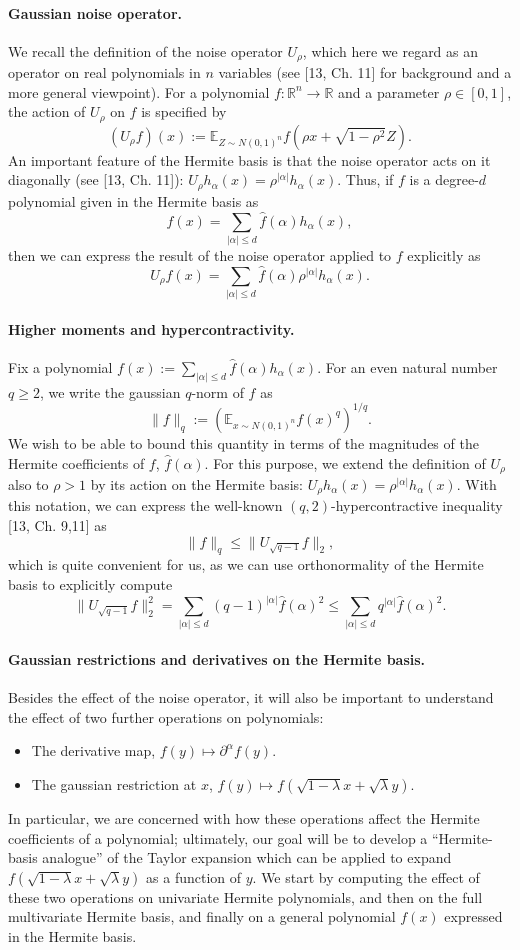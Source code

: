 \paragraph{Gaussian noise operator.} We recall the definition of the noise operator $U_\rho$, which here we regard as an operator on real polynomials in $n$ variables (see [13, Ch. 11] for background and a more general viewpoint). For a polynomial $f:\mathbb R^n\to\mathbb R$ and a parameter $\rho\in[0,1]$, the action of $U_\rho$ on $f$ is specified by
\[(U_\rho f)(x):=\mathbb E_{Z\sim N(0,1)^n}f(\rho x+\sqrt{1-\rho^2}Z).\]
An important feature of the Hermite basis is that the noise operator acts on it diagonally (see [13, Ch. 11]): $U_\rho h_\alpha(x)=\rho^{|\alpha|}h_\alpha(x)$. Thus, if $f$ is a degree-$d$ polynomial given in the Hermite basis as
\[f(x)=\sum_{|\alpha|\leq d}\widehat f(\alpha)h_\alpha(x),\]
then we can express the result of the noise operator applied to $f$ explicitly as
\[U_\rho f(x)=\sum_{|\alpha|\leq d}\widehat f(\alpha)\rho^{|\alpha|}h_\alpha(x).\]
\paragraph{Higher moments and hypercontractivity.} Fix a polynomial $f(x):=\sum_{|\alpha|\leq d}\widehat f(\alpha)h_\alpha(x)$. For an even natural number $q\geq2$, we write the gaussian $q$-norm of $f$ as
\[\|f\|_q:=\left(\mathbb E_{x\sim N(0,1)^n}f(x)^q\right)^{1/q}.\]
We wish to be able to bound this quantity in terms of the magnitudes of the Hermite coefficients of $f$, $\widehat f(\alpha)$. For this purpose, we extend the definition of $U_\rho$ also to $\rho>1$ by its action on the Hermite basis: $U_\rho h_\alpha(x)=\rho^{|\alpha|}h_\alpha(x)$. With this notation, we can express the well-known $(q,2)$-hypercontractive inequality [13, Ch. 9,11] as
\[\|f\|_q\leq\|U_{\sqrt{q-1}}f\|_2,\]
which is quite convenient for us, as we can use orthonormality of the Hermite basis to explicitly compute
\[\|U_{\sqrt{q-1}}f\|_2^2=\sum_{|\alpha|\leq d}(q-1)^{|\alpha|}\widehat f(\alpha)^2\leq\sum_{|\alpha|\leq d}q^{|\alpha|}\widehat f(\alpha)^2.\]
\paragraph{Gaussian restrictions and derivatives on the Hermite basis.} Besides the effect of the noise operator, it will also be important to understand the effect of two further operations on polynomials:
\begin{itemize}
\item The derivative map, $f(y)\mapsto\partial^\alpha f(y)$.
\item The gaussian restriction at $x$, $f(y)\mapsto f(\sqrt{1-\lambda}x+\sqrt\lambda y)$.
\end{itemize}
In particular, we are concerned with how these operations affect the Hermite coefficients of a polynomial; ultimately, our goal will be to develop a ``Hermite-basis analogue'' of the Taylor expansion which can be applied to expand $f(\sqrt{1-\lambda}x+\sqrt\lambda y)$ as a function of $y$. We start by computing the effect of these two operations on univariate Hermite polynomials, and then on the full multivariate Hermite basis, and finally on a general polynomial $f(x)$ expressed in the Hermite basis.

